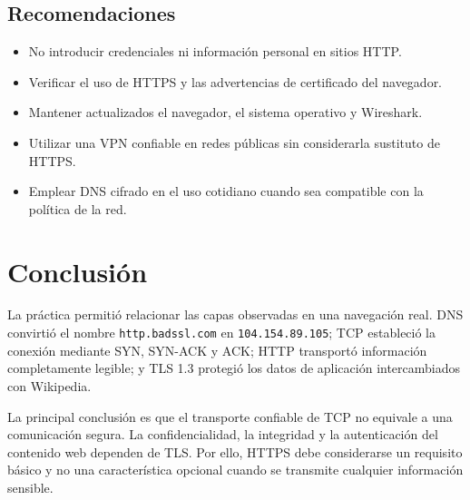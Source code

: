 \documentclass[11pt,a4paper]{article}
\begin{document}
\subsection*{Recomendaciones}

\begin{itemize}
  \item No introducir credenciales ni información personal en sitios HTTP.
  \item Verificar el uso de HTTPS y las advertencias de certificado del navegador.
  \item Mantener actualizados el navegador, el sistema operativo y Wireshark.
  \item Utilizar una VPN confiable en redes públicas sin considerarla sustituto de HTTPS.
  \item Emplear DNS cifrado en el uso cotidiano cuando sea compatible con la política de la red.
\end{itemize}

\section*{Conclusión}

La práctica permitió relacionar las capas observadas en una navegación real. DNS convirtió el nombre \texttt{http.badssl.com} en \texttt{104.154.89.105}; TCP estableció la conexión mediante SYN, SYN-ACK y ACK; HTTP transportó información completamente legible; y TLS 1.3 protegió los datos de aplicación intercambiados con Wikipedia.

La principal conclusión es que el transporte confiable de TCP no equivale a una comunicación segura. La confidencialidad, la integridad y la autenticación del contenido web dependen de TLS. Por ello, HTTPS debe considerarse un requisito básico y no una característica opcional cuando se transmite cualquier información sensible.
\end{document}
